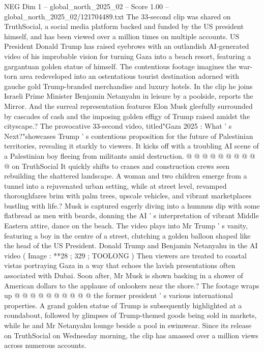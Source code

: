 \begin{textsample}{NEG Dim 1 – global\_north\_2025\_02 – Score 1.00 – global\_north\_2025\_02/121704489.txt}  \label{ex:f1_neg_015}
The 33-second clip was shared on TruthSocial, a social media platform backed and funded by the US president himself, and has been viewed over a million times on multiple accounts.
US President Donald Trump has raised eyebrows with an outlandish AI-generated video of his improbable vision for turning Gaza into a beach resort, featuring a gargantuan golden statue of himself.
The contentious footage imagines the war-torn area redeveloped into an ostentatious tourist destination adorned with gauche gold Trump-branded merchandise and luxury hotels.
In the clip he joins Israeli Prime Minister Benjamin Netanyahu in leisure by a poolside, reports the Mirror.
And the surreal representation features Elon Musk gleefully surrounded by cascades of cash and the imposing golden effigy of Trump raised amidst the cityscape.?
The provocative 33-second video, titled"Gaza 2025 : What ' s Next?"showcases Trump ' s contentious proposition for the future of Palestinian territories, revealing it starkly to viewers.
It kicks off with a troubling AI scene of a Palestinian boy fleeing from militants amid destruction. @ @ @ @ @ @ @ @ @ @ on TruthSocial It quickly shifts to cranes and construction crews seen rebuilding the shattered landscape.
A woman and two children emerge from a tunnel into a rejuvenated urban setting, while at street level, revamped thoroughfares brim with palm trees, upscale vehicles, and vibrant marketplaces bustling with life.?
Musk is captured eagerly diving into a hummus dip with some flatbread as men with beards, donning the AI ' s interpretation of vibrant Middle Eastern attire, dance on the beach.
The video plays into Mr Trump ' s vanity, featuring a boy in the centre of a street, clutching a golden balloon shaped like the head of the US President.
Donald Trump and Benjamin Netanyahu in the AI video ( Image : **28 ; 329 ; TOOLONG ) Then viewers are treated to coastal vistas portraying Gaza in a way that echoes the lavish presentations often associated with Dubai.
Soon after, Mr Musk is shown basking in a shower of American dollars to the applause of onlookers near the shore.?
The footage wraps up @ @ @ @ @ @ @ @ @ @ the former president ' s various international properties.
A grand golden statue of Trump is subsequently highlighted at a roundabout, followed by glimpses of Trump-themed goods being sold in markets, while he and Mr Netanyahu lounge beside a pool in swimwear.
Since its release on TruthSocial on Wednesday morning, the clip has amassed over a million views across numerous accounts.

\end{textsample}
